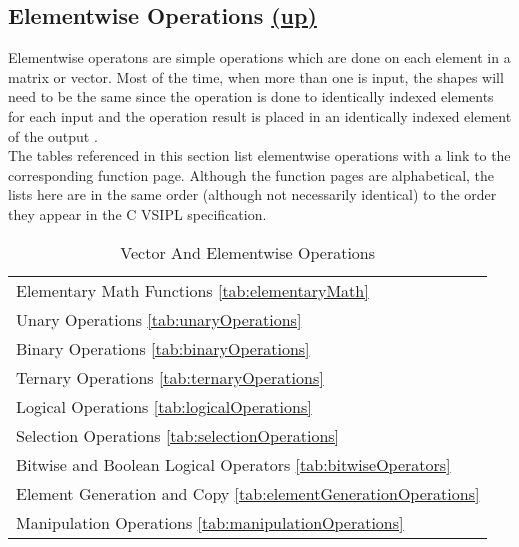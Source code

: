 \subsection*{Elementwise Operations
\hspace*{\fill}\hyperlink{VSIPspecHead}{(up)}\hypertarget{ElementwiseOperations}{}} 
Elementwise operatons are simple operations which are done on each element in a matrix or vector. Most of the time, when more than one  is input, the  shapes will need to be the same since the operation is done to identically indexed elements for each input  and the operation result is placed in an identically indexed element of the output . \\
The tables referenced in this section list elementwise operations with a link to the corresponding function page. Although the function pages are alphabetical, the lists here are in the same order (although not necessarily identical) to the order they appear in the C VSIPL specification.\\
\begin{table}[H]
\hypertarget{vectorAndElementwise}{}
\caption{Vector And Elementwise Operations}
\label{tab:elementwiseChapter}
\begin{center}
\begin{tabular}{|l|}\hline
Elementary Math Functions \ref{tab:elementaryMath}\\
Unary Operations \ref{tab:unaryOperations}\\
Binary Operations \ref{tab:binaryOperations}\\
Ternary Operations \ref{tab:ternaryOperations}\\
Logical Operations \ref{tab:logicalOperations}\\
Selection Operations \ref{tab:selectionOperations}\\
Bitwise and Boolean Logical Operators \ref{tab:bitwiseOperators}\\
Element Generation and Copy \ref{tab:elementGenerationOperations}\\
Manipulation Operations \ref{tab:manipulationOperations}\\
\hline\end{tabular}
\end{center}
\label{default}
\end{table}%
      
      
      
      
      
      
      
      
      
